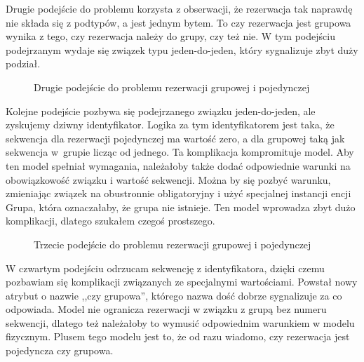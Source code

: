 \documentclass[a4paper,onecolumn,oneside,11pt,wide,floatssmall]{mwrep}
\theoremstyle{definition}
\theoremstyle{plain}%
\theoremstyle{remark}
\begin{document}
Drugie podejście do problemu korzysta z obserwacji, że rezerwacja tak naprawdę nie składa się z podtypów, a jest jednym bytem. To czy rezerwacja jest grupowa wynika z tego, czy rezerwacja należy do grupy, czy też nie. W tym podejściu podejrzanym wydaje się związek typu jeden-do-jeden, który sygnalizuje zbyt duży podział. 

\begin{figure}[H]
  \begin{center}
  \end{center}
  \caption{Drugie podejście do problemu rezerwacji grupowej i pojedynczej}
  \label{fig:db-logical-model-group-reservation-second-try}
\end{figure}

Kolejne podejście pozbywa się podejrzanego związku jeden-do-jeden, ale zyskujemy dziwny identyfikator. Logika za tym identyfikatorem jest taka, że sekwencja dla rezerwacji pojedynczej ma wartość zero, a dla grupowej taką jak sekwencja \mbox{w grupie} licząc od jednego. Ta komplikacja kompromituje model. Aby ten model spełniał wymagania, należałoby także dodać odpowiednie warunki na obowiązkowość związku i wartość sekwencji. Można by się pozbyć warunku, zmieniając związek na obustronnie obligatoryjny i użyć specjalnej instancji encji Grupa, która oznaczałaby, że grupa nie istnieje. Ten model wprowadza zbyt dużo komplikacji, dlatego szukałem czegoś prostszego.

\begin{figure}[H]
  \begin{center}
  \end{center}
  \caption{Trzecie podejście do problemu rezerwacji grupowej i pojedynczej}
  \label{fig:db-logical-model-group-reservation-third-try}
\end{figure}

W czwartym podejściu odrzucam sekwencję z identyfikatora, dzięki czemu pozbawiam się komplikacji związanych ze specjalnymi wartościami. Powstał nowy atrybut o nazwie ,,czy grupowa'', którego nazwa dość dobrze sygnalizuje za co odpowiada. Model nie ogranicza rezerwacji w związku z grupą bez numeru sekwencji, dlatego też należałoby to wymusić odpowiednim warunkiem w modelu fizycznym. Plusem tego modelu jest to, że od razu wiadomo, czy rezerwacja jest pojedyncza czy grupowa. 
\end{document}
